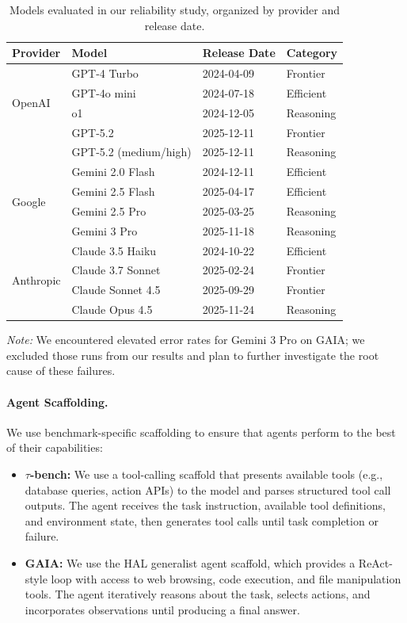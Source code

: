 \documentclass[11pt]{article}
\begin{document}
\begin{table}[h]
\centering
\small
\caption{Models evaluated in our reliability study, organized by provider and release date.}
\label{tab:models}
\begin{tabular}{llll}
\toprule
\textbf{Provider} & \textbf{Model} & \textbf{Release Date} & \textbf{Category} \\
\midrule
\multirow{4}{*}{OpenAI}
& GPT-4 Turbo & 2024-04-09 & Frontier \\
& GPT-4o mini & 2024-07-18 & Efficient \\
& o1 & 2024-12-05 & Reasoning \\
& GPT-5.2 & 2025-12-11 & Frontier \\
& GPT-5.2 (medium/high) & 2025-12-11 & Reasoning \\
\midrule
\multirow{4}{*}{Google}
& Gemini 2.0 Flash & 2024-12-11 & Efficient \\
& Gemini 2.5 Flash & 2025-04-17 & Efficient \\
& Gemini 2.5 Pro & 2025-03-25 & Reasoning \\
& Gemini 3 Pro & 2025-11-18 & Reasoning \\
\midrule
\multirow{4}{*}{Anthropic}
& Claude 3.5 Haiku & 2024-10-22 & Efficient \\
& Claude 3.7 Sonnet & 2025-02-24 & Frontier \\
& Claude Sonnet 4.5 & 2025-09-29 & Frontier \\
& Claude Opus 4.5 & 2025-11-24 & Reasoning \\
\bottomrule
\end{tabular}
\end{table}

\textit{Note:} We encountered elevated error rates for Gemini 3 Pro on GAIA; we excluded those runs from our results and plan to further investigate the root cause of these failures.

\paragraph{Agent Scaffolding.} We use benchmark-specific scaffolding to ensure that agents perform to the best of their capabilities:

\begin{itemize}[leftmargin=*,itemsep=2pt]
    \item \textbf{$\tau$-bench:} We use a tool-calling scaffold that presents available tools (e.g., database queries, action APIs) to the model and parses structured tool call outputs. The agent receives the task instruction, available tool definitions, and environment state, then generates tool calls until task completion or failure.
    \item \textbf{GAIA:} We use the HAL generalist agent scaffold, which provides a ReAct-style loop with access to web browsing, code execution, and file manipulation tools. The agent iteratively reasons about the task, selects actions, and incorporates observations until producing a final answer.
\end{itemize}
\end{document}
